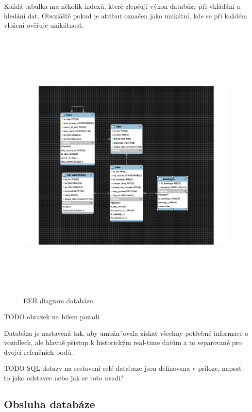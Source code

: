 \bigbreak

Každá tabulka ma několik indexů, které zlepšují výkon databáze při vkládání a hledání dat. Obvzláště pokud je atribut označen jako unikátní, kde se při každém vložení ověřuje unikátnost.

\begin{figure}[p]\centering
\includegraphics[width=140mm, height=140mm]{../img/eer_database}
\caption{EER diagram databáze.}
\label{obr01:EER}

\end{figure}

TODO obrazek na bilem pozadi

Databáza je nastavená tak, aby umožnˇovala získat všechny potřebné informace o vozidlech, ale hlavně přístup k historickým real-time datům a to separovaně pro dvojci refenčních bodů.

TODO SQL dotazy na sestavení celé databaze jsou definovana v priloze, napsat to jako odstavec nebo jak se toto uvadi?

\subsection{Obsluha databáze}

